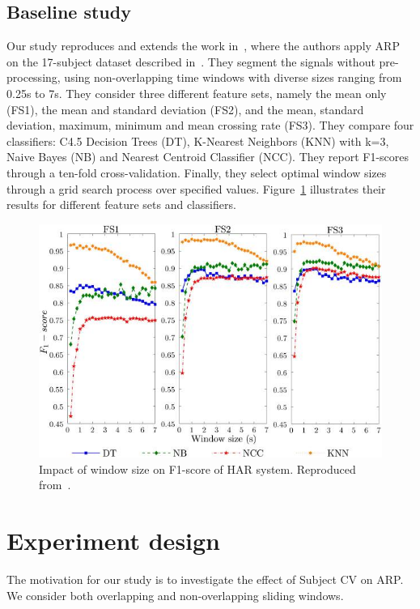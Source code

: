\documentclass[sigconf]{acmart}
\begin{document}
\subsection{Baseline study} \label{sub:theirwork}

Our study reproduces and extends the work in~\cite{banos2014window}, where the authors apply ARP on the 17-subject dataset
described in~\cite{banos2012benchmark}. They segment the signals without pre-processing, 
using non-overlapping time windows with diverse sizes ranging from 
0.25s to 7s. They consider three different feature sets, namely the
mean only (FS1), the mean and standard deviation (FS2), and the mean, 
standard deviation, maximum, minimum and mean crossing rate (FS3). They 
compare four classifiers: C4.5 Decision Trees (DT), K-Nearest Neighbors 
(KNN) with k=3, Naive Bayes (NB) and Nearest Centroid Classifier (NCC). 
They report F1-scores through a ten-fold cross-validation. 
Finally, they select optimal window sizes through a grid search process 
over specified values. Figure~\ref{fig:Banos et al result} illustrates their results for different feature sets and classifiers. 


\begin{figure}[htp]
    \centering
    \includegraphics[width=.5\textwidth]{Figures/Banosresults.jpeg}
    \caption{Impact of window size on F1-score of HAR system. Reproduced from~\cite{banos2014window}.}
    \label{fig:Banos et al result}
\end{figure}



\section{Experiment design} \label{sec:experiment setting}
The motivation for our study is to investigate the effect of Subject CV on ARP. We consider both overlapping and non-overlapping sliding windows. 
\end{document}
